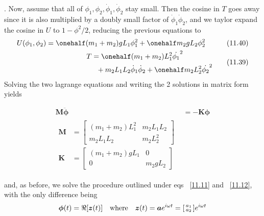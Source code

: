 \documentclass[10pt, twocolumn]{article}
\DeclareRobustCommand{\mybox}[2][gray!20]{%
	\begin{tcolorbox}[   %
		breakable,
		left=0pt,
		right=0pt,
		top=-13pt,
		bottom=0pt,
		colback=#1,
		colframe=#1,
		width=0.45\dimexpr\textwidth\relax,
		enlarge left by=0mm,
		boxsep=1pt,
		arc=0pt,outer arc=0pt,
		]
		#2
	\end{tcolorbox}
}
\newcommand\graybox[1]{ \mybox[gray!20]{\begin{align}#1\end{align}} }
\newcommand{\myspace}{\vspace{3\bigskipamount}}
\newcommand\p{\Needspace{10\baselineskip} \noindent}
\newcommand\tlab[1]{\tag{#1}\label{#1}}
\begin{document}
\myspace
\p {}. Now, assume that all of $\phi_1, \phi_2, \dot{\phi}_1, \dot \phi_2$ stay small. Then the cosine in $T$ goes away since it is also multiplied by a doubly small factor of $\dot{\phi}_1\dot{\phi}_2$, and we taylor expand the cosine in $U$ to $1 - \phi^2/2$, reducing the previous equations to
\begin{align}
\begin{split}
U(\phi_1, \phi_2) &= \onehalf(m_1 + m_2)g L_1 \phi_1^2 + \onehalf m_2 g L_2\phi_2^2
\end{split}\tlab{11.40}\\
\begin{split}
T &= \onehalf (m_1 + m_2) L_1^2 \dot{\phi_1}^2 \\
&~~	+ m_2 L_1 L_2 \dot{\phi}_1\dot{\phi}_2 +  \onehalf m_2 L_2^2 \dot{\phi_2}^2 
\end{split}\tlab{11.39}
\end{align}
Solving the two lagrange equations and writing the 2 solutions in matrix form yields
\graybox{
	\mathbf M \bm{\ddot{\phi}} &= -\mathbf K \bm{\phi} \tlab{11.43} \\
	\begin{split}
	\mathbf M &= 
		\begin{bmatrix}
			(m_1 + m_2)L_1^2 & m_2 L_1 L_2 \\
			m_2 L_1 L_2 & m_2 L_2^2
		\end{bmatrix} 
	\\
	\mathbf K &= 
	\begin{bmatrix}
		(m_1 + m_2)gL_1 & 0 \\
		0 & m_2 g L_2
	\end{bmatrix}
	\end{split}\tlab{11.44}
	}
and, as before, we solve the procedure outlined under eqs ~\ref{11.11} and ~\ref{11.12}, with the only difference being
$$
	\bm{\phi}(t) = \Re[\bm{z}(t)] 
	\quad \text{where} \quad 
	\bm{z}(t) = \bm a e^{i \omega t} = \begin{bsmallmatrix}a_1\\ a_2 \end{bsmallmatrix} e^{i \omega t}
$$
\end{document}
